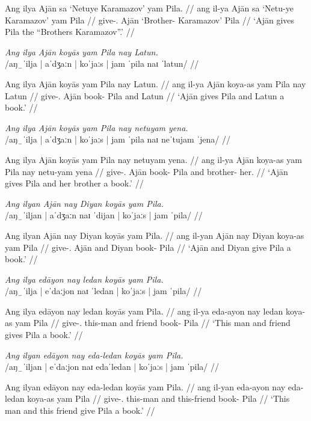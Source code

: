 \documentclass[12pt,a4paper]{scrartcl}
\newcommand{\TsgM}{{\Tsg}.{\M}}
\newcommand{\TplM}{{\Tpl}.{\M}}
\begin{document}
\gla Ang ilya Ajān sa `Netuye Karamazov' yam Pila. //
\glb ang il-ya Ajān sa `Netu-ye Karamazov' yam Pila //
\glc \AgtT{} give-\TsgM{} Ajān \Parg{} `Brother-\Pl{} Karamazov' \Dat{} Pila //
\glft `Ajān gives Pila the “Brothers Karamazov”.' //
\endgl\xe

\ex\begingl
\glpreamble \textit{Ang ilya Ajān koyās yam Pila nay Latun.}\\
	/aŋ‿ˈilja | aˈdʒaːn | koˈjaːs | jam ˈpila naɪ ˈlatun/ //

\gla Ang ilya Ajān koyās yam Pila nay Latun. //
\glb ang il-ya Ajān koya-as yam Pila nay Latun //
\glc \AgtT{} give-\TsgM{} Ajān book-\Parg{} \Dat{} Pila and Latun //
\glft `Ajān gives Pila and Latun a book.' //
\endgl\xe

\ex\begingl
\glpreamble \textit{Ang ilya Ajān koyās yam Pila nay netuyam yena.}\\
	/aŋ‿ˈilja | aˈdʒaːn | koˈjaːs | jam ˈpila naɪ neˈtujam ˈjena/ //

\gla Ang ilya Ajān koyās yam Pila nay netuyam yena. //
\glb ang il-ya Ajān koya-as yam Pila nay netu-yam yena //
\glc \AgtT{} give-\TsgM{} Ajān book-\Parg{} \Dat{} Pila and brother-\Dat{} her.\Gen{} //
\glft `Ajān gives Pila and her brother a book.' //
\endgl\xe

\ex\begingl
\glpreamble \textit{Ang ilyan Ajān nay Diyan koyās yam Pila.}\\
	/aŋ‿ˈiljan | aˈdʒaːn naɪ ˈdijan | koˈjaːs | jam ˈpila/ //

\gla Ang ilyan Ajān nay Diyan koyās yam Pila. //
\glb ang il-yan Ajān nay Diyan koya-as yam Pila //
\glc \AgtT{} give-\TplM{} Ajān and Diyan book-\Parg{} \Dat{} Pila //
\glft `Ajān and Diyan give Pila a book.' //
\endgl\xe

\ex\begingl
\glpreamble \textit{Ang ilya edāyon nay ledan koyās yam Pila.}\\
	/aŋ‿ˈilja | eˈdaːjon naɪ ˈledan | koˈjaːs | jam ˈpila/ //

\gla Ang ilya edāyon nay ledan koyās yam Pila. //
\glb ang il-ya eda-ayon nay ledan koya-as yam Pila //
\glc \AgtT{} give-\TsgM{} this-man and friend book-\Parg{} \Dat{} Pila //
\glft `This man and friend gives Pila a book.' //
\endgl\xe

\ex\begingl
\glpreamble \textit{Ang ilyan edāyon nay eda-ledan koyās yam Pila.}\\
	/aŋ‿ˈiljan | eˈdaːjon naɪ edaˈledan | koˈjaːs | jam ˈpila/ //

\gla Ang ilyan edāyon nay eda-ledan koyās yam Pila. //
\glb ang il-yan eda-ayon nay eda-ledan koya-as yam Pila //
\glc \AgtT{} give-\TplM{} this-man and this-friend book-\Parg{} \Dat{} Pila //
\glft `This man and this friend give Pila a book.' //
\endgl\xe
\end{document}
